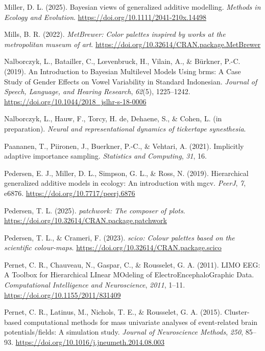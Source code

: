 \documentclass[
  doc,
  floatsintext,
  longtable,
  a4paper,
  nolmodern,
  notxfonts,
  notimes,
  colorlinks=true,linkcolor=blue,citecolor=blue,urlcolor=blue]{apa7}
\newlength{\cslhangindent}
\newenvironment{CSLReferences}[2] %
 {\begin{list}{}{%
  \setlength{\itemindent}{0pt}
  \setlength{\leftmargin}{0pt}
  \setlength{\parsep}{0pt}
  \ifodd #1
   \setlength{\leftmargin}{\cslhangindent}
   \setlength{\itemindent}{-1\cslhangindent}
  \fi
  \setlength{\itemsep}{#2\baselineskip}}}
 {\end{list}}
\begin{document}
\begin{CSLReferences}{1}{0}
Miller, D. L. (2025). Bayesian views of generalized additive modelling.
\emph{Methods in Ecology and Evolution}.
\url{https://doi.org/10.1111/2041-210x.14498}

Mills, B. R. (2022). \emph{{MetBrewer}: Color palettes inspired by works
at the metropolitan museum of art}.
\url{https://doi.org/10.32614/CRAN.package.MetBrewer}

Nalborczyk, L., Batailler, C., Lœvenbruck, H., Vilain, A., \& Bürkner,
P.-C. (2019). An Introduction to Bayesian Multilevel Models Using brms:
A Case Study of Gender Effects on Vowel Variability in Standard
Indonesian. \emph{Journal of Speech, Language, and Hearing Research},
\emph{62}(5), 1225--1242.
\url{https://doi.org/10.1044/2018_jslhr-s-18-0006}

Nalborczyk, L., Hauw, F., Torcy, H. de, Dehaene, S., \& Cohen, L. (in
preparation). \emph{Neural and representational dynamics of tickertape
synesthesia}.

Paananen, T., Piironen, J., Buerkner, P.-C., \& Vehtari, A. (2021).
Implicitly adaptive importance sampling. \emph{Statistics and
Computing}, \emph{31}, 16.

Pedersen, E. J., Miller, D. L., Simpson, G. L., \& Ross, N. (2019).
Hierarchical generalized additive models in ecology: An introduction
with mgcv. \emph{PeerJ}, \emph{7}, e6876.
\url{https://doi.org/10.7717/peerj.6876}

Pedersen, T. L. (2025). \emph{{patchwork}: The composer of plots}.
\url{https://doi.org/10.32614/CRAN.package.patchwork}

Pedersen, T. L., \& Crameri, F. (2023). \emph{{scico}: Colour palettes
based on the scientific colour-maps}.
\url{https://doi.org/10.32614/CRAN.package.scico}

Pernet, C. R., Chauveau, N., Gaspar, C., \& Rousselet, G. A. (2011).
LIMO EEG: A Toolbox for Hierarchical LInear MOdeling of
ElectroEncephaloGraphic Data. \emph{Computational Intelligence and
Neuroscience}, \emph{2011}, 1--11.
\url{https://doi.org/10.1155/2011/831409}

Pernet, C. R., Latinus, M., Nichols, T. E., \& Rousselet, G. A. (2015).
Cluster-based computational methods for mass univariate analyses of
event-related brain potentials/fields: A simulation study. \emph{Journal
of Neuroscience Methods}, \emph{250}, 85--93.
\url{https://doi.org/10.1016/j.jneumeth.2014.08.003}


\end{CSLReferences}
\end{document}
